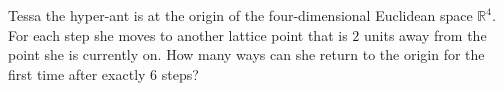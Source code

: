 Tessa the hyper-ant is at the origin of the four-dimensional Euclidean space $\mathbb R^4$. For each step she moves to another lattice point that is $2$ units away from the point she is currently on. How many ways can she return to the origin for the first time after exactly $6$ steps?
